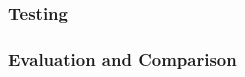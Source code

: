 \documentclass[../MasterThesis.tex]{subfiles}
\begin{document}



\subsubsection{Testing} 


\subsubsection{Evaluation and Comparison}






	
	
	
	
\end{document}
